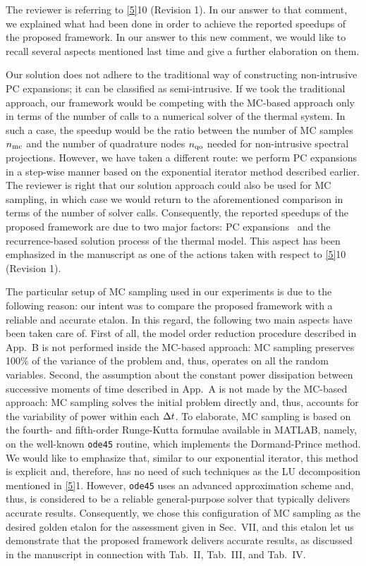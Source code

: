 \begin{authors}
The reviewer is referring to \cref{5}{10 (Revision 1)}.
In our answer to that comment, we explained what had been done in order to achieve the reported speedups of the proposed framework.
In our answer to this new comment, we would like to recall several aspects mentioned last time and give a further elaboration on them.

Our solution does not adhere to the traditional way of constructing non-intrusive PC expansions; it can be classified as semi-intrusive.
If we took the traditional approach, our framework would be competing with the MC-based approach only in terms of the number of calls to a numerical solver of the thermal system.
In such a case, the speedup would be the ratio between the number of MC samples ${n_\text{mc}}$ and the number of quadrature nodes ${n_\text{qo}}$ needed for non-intrusive spectral projections.
However, we have taken a different route: we perform PC expansions in a step-wise manner based on the exponential iterator method described earlier.
The reviewer is right that our solution approach could also be used for MC sampling, in which case we would return to the aforementioned comparison in terms of the number of solver calls.
Consequently, the reported speedups of the proposed framework are due to two major factors: PC expansions \perse\ and the recurrence-based solution process of the thermal model.
This aspect has been emphasized in the manuscript as one of the actions taken with respect to \cref{5}{10 (Revision 1)}.

The particular setup of MC sampling used in our experiments is due to the following reason: our intent was to compare the proposed framework with a reliable and accurate etalon.
In this regard, the following two main aspects have been taken care of.
First of all, the model order reduction procedure described in App.~B is not performed inside the MC-based approach: MC sampling preserves 100\% of the variance of the problem and, thus, operates on all the random variables.
Second, the assumption about the constant power dissipation between successive moments of time described in App.~A is not made by the MC-based approach: MC sampling solves the initial problem directly and, thus, accounts for the variability of power within each $\Delta t$.
To elaborate, MC sampling is based on the fourth- and fifth-order Runge-Kutta formulae available in MATLAB, namely, on the well-known \texttt{ode45} routine, which implements the Dormand-Prince method.
We would like to emphasize that, similar to our exponential iterator, this method is explicit and, therefore, has no need of such techniques as the LU decomposition mentioned in \cref{5}{1}.
However, \texttt{ode45} uses an advanced approximation scheme and, thus, is considered to be a reliable general-purpose solver that typically delivers accurate results.
Consequently, we chose this configuration of MC sampling as the desired golden etalon for the assessment given in Sec.~VII, and this etalon let us demonstrate that the proposed framework delivers accurate results, as discussed in the manuscript in connection with Tab.~II, Tab.~III, and Tab.~IV.


\end{authors}
